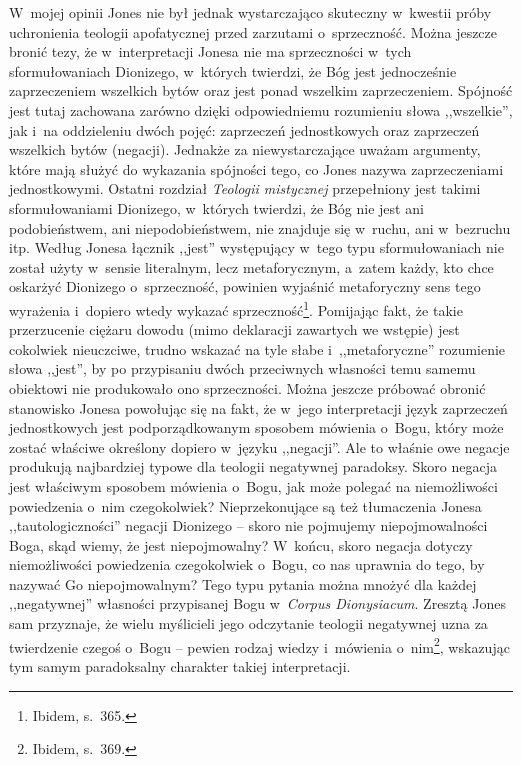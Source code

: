W~mojej opinii Jones nie był jednak wystarczająco skuteczny w~kwestii próby uchronienia teologii apofatycznej przed zarzutami o~sprzeczność. Można jeszcze bronić tezy, że w~interpretacji Jonesa nie ma sprzeczności w~tych sformułowaniach Dionizego, w~których twierdzi, że Bóg jest jednocześnie zaprzeczeniem wszelkich bytów oraz jest ponad wszelkim zaprzeczeniem. Spójność jest tutaj zachowana zarówno dzięki odpowiedniemu rozumieniu słowa ,,wszelkie'', jak i~na oddzieleniu dwóch pojęć: zaprzeczeń jednostkowych oraz zaprzeczeń wszelkich bytów (negacji). Jednakże za niewystarczające uważam argumenty, które mają służyć do wykazania spójności tego, co Jones nazywa zaprzeczeniami jednostkowymi. Ostatni rozdział \textit{Teologii mistycznej} przepełniony jest takimi sformułowaniami Dionizego, w~których twierdzi, że Bóg nie jest ani podobieństwem, ani niepodobieństwem, nie znajduje się w~ruchu, ani w~bezruchu itp. Według Jonesa łącznik ,,jest'' występujący w~tego typu sformułowaniach nie został użyty w~sensie literalnym, lecz metaforycznym, a~zatem każdy, kto chce oskarżyć Dionizego o~sprzeczność, powinien wyjaśnić metaforyczny sens tego wyrażenia i~dopiero wtedy wykazać sprzeczność\footnote{Ibidem, s.~365.}. Pomijając fakt, że takie przerzucenie ciężaru dowodu (mimo deklaracji zawartych we wstępie) jest cokolwiek nieuczciwe, trudno wskazać na tyle słabe i~,,metaforyczne'' rozumienie słowa ,,jest'', by po przypisaniu dwóch przeciwnych własności temu samemu obiektowi nie produkowało ono sprzeczności. Można jeszcze próbować obronić stanowisko Jonesa powołując się na fakt, że w~jego interpretacji język zaprzeczeń jednostkowych jest podporządkowanym sposobem mówienia o~Bogu, który może zostać właściwe określony dopiero w~języku ,,negacji''. Ale to właśnie owe negacje produkują najbardziej typowe dla teologii negatywnej paradoksy. Skoro negacja jest właściwym sposobem mówienia o~Bogu, jak może polegać na niemożliwości powiedzenia o~nim czegokolwiek? Nieprzekonujące są też tłumaczenia Jonesa ,,tautologiczności'' negacji Dionizego -- skoro nie pojmujemy niepojmowalności Boga, skąd wiemy, że jest niepojmowalny? W~końcu, skoro negacja dotyczy niemożliwości powiedzenia czegokolwiek o~Bogu, co nas uprawnia do tego, by nazywać Go niepojmowalnym? Tego typu pytania można mnożyć dla każdej ,,negatywnej'' własności przypisanej Bogu w~\textit{Corpus Dionysiacum}. Zresztą Jones sam przyznaje, że wielu myślicieli jego odczytanie teologii negatywnej uzna za twierdzenie czegoś o~Bogu -- pewien rodzaj wiedzy i~mówienia o~nim\footnote{Ibidem, s.~369.}, wskazując tym samym paradoksalny charakter takiej interpretacji.

